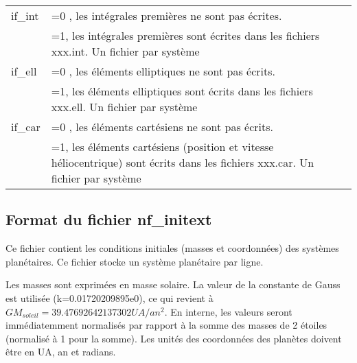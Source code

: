 \documentclass[11pt]{article}
\begin{document}
\begin{tabularx}{\textwidth}{|l|X|}
 if\_int & =0 , les int\'egrales premi\`eres ne sont pas \'ecrites.\\
&=1, les int\'egrales premi\`eres sont \'ecrites dans les fichiers xxx.int. Un fichier par syst\`eme\\ \hline
 
 if\_ell & =0 , les \'el\'ements elliptiques ne sont pas \'ecrits.\\
&=1, les \'el\'ements elliptiques sont \'ecrits dans les fichiers xxx.ell. Un fichier par syst\`eme\\ \hline
 
 if\_car &  =0 , les \'el\'ements cart\'esiens ne sont pas \'ecrits.\\
&=1, les \'el\'ements cart\'esiens (position et vitesse h\'eliocentrique) sont \'ecrits dans les fichiers xxx.car. Un fichier par syst\`eme\\
\hline 
 \end{tabularx}



\subsection{Format du fichier nf\_initext}

Ce fichier contient les conditions initiales (masses et coordonn\'ees) des syst\`emes plan\'etaires. 
Ce fichier stocke un syst\`eme plan\'etaire par ligne.

Les masses sont exprimées en masse solaire.  La valeur de la constante de Gauss est utilisée (k=0.01720209895e0), ce qui revient à $GM_{soleil}=39.47692642137302 UA/an^2$. 
En interne, les valeurs seront imm\'ediatemment normalis\'es par rapport \`a la somme des masses de 2 \'etoiles (normalis\'e \`a 1 pour la somme).
Les unit\'es des coordonn\'ees des plan\`etes doivent \^etre en UA, an et radians.
\end{document}
